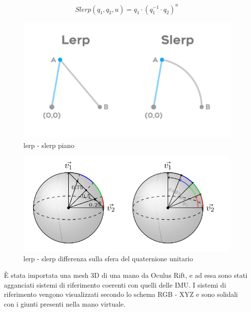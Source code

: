 \begin{equation}
    Slerp(q_1,q_2,u) = q_1\cdot(q_1^{-1} \cdot q_2)^{u}
    \label{slerp}
\end{equation}

\begin{figure}[H]
    \includegraphics[scale=0.3]{immagini/lerp.jpg}
    \centering
    \caption{lerp - slerp piano}
\end{figure}

\begin{figure}[H]
    \includegraphics[scale=0.7]{immagini/slerplerp.png}
    \centering
    \caption{lerp - slerp differenza sulla sfera del quaternione unitario}
\end{figure}

È stata importata una mesh 3D di una mano da Oculus Rift, e ad essa sono stati agganciati sistemi di riferimento coerenti con quelli delle IMU.
I sistemi di riferimento vengono visualizzati secondo lo schema RGB - XYZ e sono solidali con i giunti presenti nella mano virtuale.

